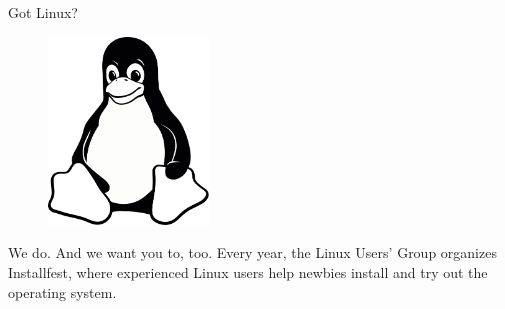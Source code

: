 \documentclass[10pt]{article}
\begin{document}
\pagestyle{empty}

\begin{center} \LARGE \textsc
    Got Linux?
\end{center}

\begin{figure}
    \vspace{-2em} %
    \begin{center}
        \includegraphics[width=0.38\textwidth]{tux-bw}
    \end{center}
\end{figure}

We do. And we want you to, too. Every year, the Linux Users' Group organizes
Installfest, where experienced Linux users help newbies install and try out the
operating system.
\end{document}
